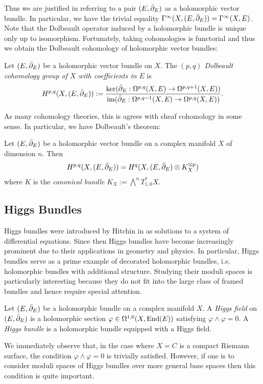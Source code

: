 \documentclass[12pt]{ociamthesis}  %
\begin{document}
Thus we are justified in referring to a pair $(E,{\bar{\partial}}_E)$ as a
holomorphic vector bundle. In particular, we have the trivial
equality $\Gamma^\infty(X,(E,{\bar{\partial}}_E)) = \Gamma^\infty(X,E)$.
Note that the Dolbeault operator induced by a holomorphic bundle is
unique only up to isomorphism. Fortunately, taking cohomologies
is functorial and thus we obtain the Dolbeault cohomology of
holomorphic vector bundles:

\begin{definition}
  Let $(E,{\bar{\partial}}_E)$ be a holomorphic vector bundle on $X$. The
  \emph{$(p,q)$ Dolbeault cohomology group of $X$ with coefficients in
    $E$} is
  \begin{align*}
    H^{p,q}(X,(E,{\bar{\partial}}_E)) := \frac{
      \ker({\bar{\partial}}_E : \Omega^{p,q}(X,E) \to \Omega^{p,q+1}(X,E))
    }{
      \operatorname{im}({\bar{\partial}}_E : \Omega^{p,q-1}(X,E) \to \Omega^{p,q}(X,E))
    }.
  \end{align*}
\end{definition}

As many cohomology theories, this is agrees with sheaf cohomology
in some sense. In particular, we have Dolbeault's theorem:

\begin{theorem}[Dolbeault]\label{thm:dolbeault}
  Let $(E,{\bar{\partial}}_E)$ be a holomorphic vector bundle on a complex manifold
  $X$ of dimension $n$. Then
  \begin{align*}
    H^{p,q}(X,(E,{\bar{\partial}}_E)) = H^q(X,(E,{\bar{\partial}}_E)\otimes K^{\otimes p}_X)
  \end{align*}
  where $K$ is the \emph{canonical bundle}
  $K_X := \bigwedge^n T_{1,0}^* X$.
\end{theorem}

\subsection{Higgs Bundles}

Higgs bundles were introduced by Hitchin in \cite{hitchin1987}
as solutions to a system of differential equations. Since then
Higgs bundles have become increasingly prominent due to their applications
in geometry and physics. In particular, Higgs bundles serve as a
prime example of decorated holomorphic bundles, i.e. holomorphic bundles
with additional structure. Studying their moduli spaces is particularly
interesting because they do not fit into the large class of framed
bundles and hence require special attention.
\cite[Example 4.B.3]{huybrechts2010}

\begin{definition}
  Let $(E,{\bar{\partial}}_E)$ be a holomorphic bundle on a complex manifold $X$.
  A \emph{Higgs field} on $(E,{\bar{\partial}}_E)$ is a holomorphic section
  $\varphi \in \Omega^{1,0}(X,\operatorname{End}(E))$ satisfying $\varphi\wedge\varphi = 0$.
  A \emph{Higgs bundle} is a holomorphic bundle equipped with
  a Higgs field.
\end{definition}
We immediately observe that, in the case where $X=C$ is a compact
Riemann surface, the condition $\varphi\wedge\varphi=0$ is trivially
satisfied. However, if one is to consider moduli spaces of Higgs bundles
over more general base spaces then this condition is quite important.
\end{document}
